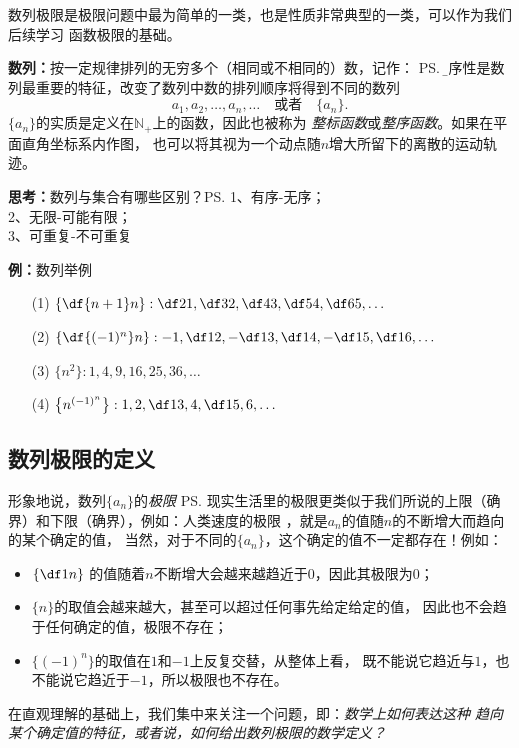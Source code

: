 数列极限是极限问题中最为简单的一类，也是性质非常典型的一类，可以作为我们后续学习
函数极限的基础。

{\bf 数列：}按一定规律排列的无穷多个（相同或不相同的）数，记作：
\ps{\b 有序性是数列最重要的特征，改变了数列中数的排列顺序将得到不同的数列}
$$a_1,a_2,\ldots,a_n,\ldots\quad\mbox{或者}\quad\{a_n\}.$$
$\{a_n\}$的实质是定义在$\mathbb{N}_+$上的函数，因此也被称为
{\it 整标函数}或{\it 整序函数}。如果在平面直角坐标系内作图，
也可以将其视为一个动点随$n$增大所留下的离散的运动轨迹。

{\bf 思考：}数列与集合有哪些区别？\ps{1、有序-无序；\\ 2、无限-可能有限；\\ 3、可重复-不可重复}

{\bf 例：}数列举例

\begin{enumerate}[(1)]
  \setlength{\itemindent}{1cm}
  \item[(1)] $\left\{\df{n+1}n\right\}:\df 21,\df 32,\df43,\df54,\df65,\ldots$
  \item[(2)] $\left\{\df{(-1)^n}n\right\}:-1,\df12,-\df13,\df14,-\df15,\df16,\ldots$
  \item[(3)] $\{n^2\}:1,4,9,16,25,36,\ldots$
  \item[(4)] $\left\{n^{(-1)^n}\right\}:1,2,\df13,4,\df15,6,\ldots$
\end{enumerate}

\subsection{数列极限的定义}

形象地说，数列$\{a_n\}$的{\it 极限}
\ps{现实生活里的极限更类似于我们所说的上限（确界）和下限（确界），例如：人类速度的极限}
，就是$a_n$的值随$n$的不断增大而趋向的某个确定的值，
当然，对于不同的$\{a_n\}$，这个确定的值不一定都存在！例如：
\begin{itemize}
  \item $\left\{\df1n\right\}$
  的值随着$n$不断增大会越来越趋近于$0$，因此其极限为$0$；
  \item $\{n\}$的取值会越来越大，甚至可以超过任何事先给定给定的值，
  因此也不会趋于任何确定的值，极限不存在；
  \item $\{(-1)^n\}$的取值在$1$和$-1$上反复交替，从整体上看，
  既不能说它趋近与$1$，也不能说它趋近于$-1$，所以极限也不存在。
\end{itemize}

在直观理解的基础上，我们集中来关注一个问题，即：{\it 数学上如何表达这种
趋向某个确定值的特征，或者说，如何给出数列极限的数学定义？}

